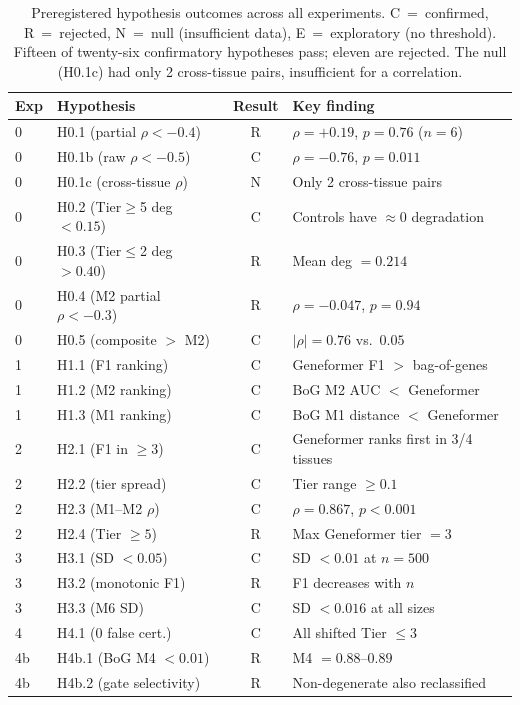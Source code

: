\documentclass[11pt,letterpaper]{article}
\begin{document}
\begin{table}[t]
\centering
\caption{Preregistered hypothesis outcomes across all experiments. C~=~confirmed, R~=~rejected, N~=~null (insufficient data), E~=~exploratory (no threshold). Fifteen of twenty-six confirmatory hypotheses pass; eleven are rejected. The null (H0.1c) had only 2 cross-tissue pairs, insufficient for a correlation.}
\label{tab:hypotheses}
\small
\begin{tabular}{@{}llcl@{}}
\toprule
Exp & Hypothesis & Result & Key finding \\
\midrule
0 & H0.1 (partial $\rho < -0.4$) & R & $\rho = +0.19$, $p = 0.76$ ($n = 6$) \\
0 & H0.1b (raw $\rho < -0.5$) & C & $\rho = -0.76$, $p = 0.011$ \\
0 & H0.1c (cross-tissue $\rho$) & N & Only 2 cross-tissue pairs \\
0 & H0.2 (Tier$\geq$5 deg $< 0.15$) & C & Controls have $\approx 0$ degradation \\
0 & H0.3 (Tier$\leq$2 deg $> 0.40$) & R & Mean deg $= 0.214$ \\
0 & H0.4 (M2 partial $\rho < -0.3$) & R & $\rho = -0.047$, $p = 0.94$ \\
0 & H0.5 (composite $>$ M2) & C & $|\rho| = 0.76$ vs.\ $0.05$ \\
\midrule
1 & H1.1 (F1 ranking) & C & Geneformer F1 $>$ bag-of-genes \\
1 & H1.2 (M2 ranking) & C & BoG M2 AUC $<$ Geneformer \\
1 & H1.3 (M1 ranking) & C & BoG M1 distance $<$ Geneformer \\
\midrule
2 & H2.1 (F1 in $\geq 3$) & C & Geneformer ranks first in 3/4 tissues \\
2 & H2.2 (tier spread) & C & Tier range $\geq 0.1$ \\
2 & H2.3 (M1--M2 $\rho$) & C & $\rho = 0.867$, $p < 0.001$ \\
2 & H2.4 (Tier $\geq 5$) & R & Max Geneformer tier $= 3$ \\
\midrule
3 & H3.1 (SD $< 0.05$) & C & SD $< 0.01$ at $n = 500$ \\
3 & H3.2 (monotonic F1) & R & F1 decreases with $n$ \\
3 & H3.3 (M6 SD) & C & SD $< 0.016$ at all sizes \\
\midrule
4 & H4.1 (0 false cert.) & C & All shifted Tier $\leq 3$ \\
\midrule
4b & H4b.1 (BoG M4 $< 0.01$) & R & M4 $= 0.88$--$0.89$ \\
4b & H4b.2 (gate selectivity) & R & Non-degenerate also reclassified \\

\end{tabular}
\end{table}
\end{document}
